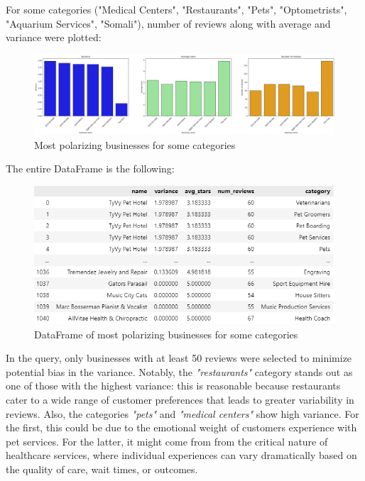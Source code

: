 \documentclass{Configuration_Files/PoliMi3i_thesis}
\begin{document}
\bigskip

For some categories ("Medical Centers", "Restaurants", "Pets", "Optometrists", "Aquarium Services", "Somali"), number of reviews along with average and variance were plotted:

\bigskip

\begin{figure}[H]
    \centering
    \includegraphics[width=\columnwidth]{imgs/most_polarizing_businesses.png}
    \caption{Most polarizing businesses for some categories}
    \label{fig:most_polarizing_businesses}
\end{figure}

\bigskip

The entire DataFrame is the following:

\bigskip

\begin{figure}[H]
    \centering
    \includegraphics[width=\columnwidth]{imgs/most_polarizing_businesses_table.png}
    \caption{DataFrame of most polarizing businesses for some categories}
    \label{fig:most_polarizing_businesses_table}
\end{figure}

\bigskip

In the query, only businesses with at least 50 reviews were selected to minimize potential bias in the variance. Notably, the \textit{"restaurants"} category stands out as one of those with the highest variance: this is reasonable because restaurants cater to a wide range of customer preferences that leads to greater variability in reviews. Also, the categories \textit{"pets"} and \textit{"medical centers"} show high variance. For the first, this could be due to the emotional weight of customers experience with pet services. For the latter, it might come from from the critical nature of healthcare services, where individual experiences can vary dramatically based on the quality of care, wait times, or outcomes.
\end{document}
